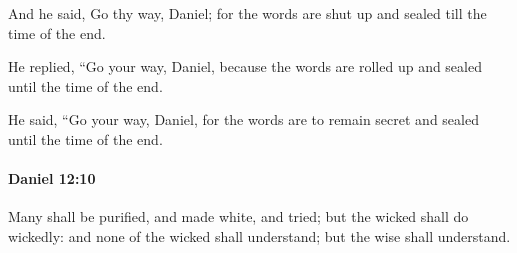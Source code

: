 			\begin{versebox}
					\item[BHS] 
					\item[LXX] 
					\item[ASV] And he said, Go thy way, Daniel; for the words are shut up and sealed till the time of the end.
					\item[NIV] He replied, “Go your way, Daniel, because the words are rolled up and sealed until the time of the end.
					\item[NRSV] He said, “Go your way, Daniel, for the words are to remain secret and sealed until the time of the end.
			\end{versebox}

		\paragraph{Daniel 12:10} %
			\label{DANIEL-12-10}

			Many shall be purified, and made white, and tried; but the wicked shall do wickedly: and none of the wicked shall understand; but the wise shall understand.

